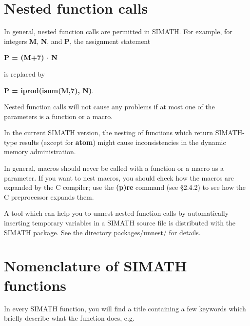 
\section{Nested function calls}
In general, nested function calls are permitted in SIMATH. For example,
for integers {\bf M}, {\bf N}, and {\bf P}, the assignment statement
\begin{center}
{\bf P = (M+7) $\cdot$ N}
\end{center}
is replaced by
\begin{center}
             {\bf P = iprod(isum(M,7), N)}.
\end{center}

Nested function calls will not cause any problems if at most one of 
the parameters is a function or a macro.

In the current SIMATH version, the nesting of functions which return SIMATH-type
results (except for {\bf atom}) might cause inconsistencies in the dynamic memory
administration. 

In general, macros should never be called with a function or a macro as a parameter. 
If you want to nest macros, you should check how the macros are expanded by the C
compiler; use the {\bf (p)re} command (see \S 2.4.2) to see how the C preprocessor
expands them.

A tool which can help you to unnest nested function calls by automatically
inserting temporary variables in a SIMATH source file is distributed with 
the SIMATH package. See the directory packages/unnest/ for details.  



\newpage
\section{Nomenclature of SIMATH functions}
In every SIMATH function, you will find a title containing a few keywords which briefly 
describe what the function does, e.g.


